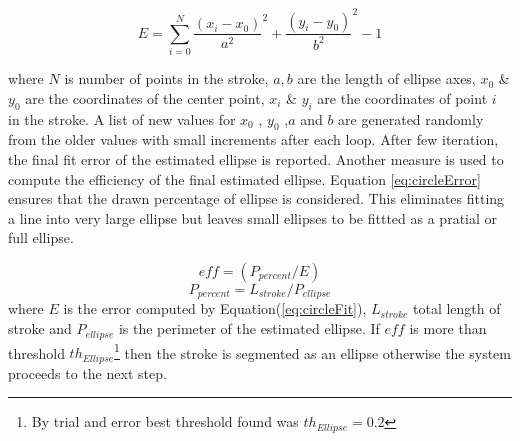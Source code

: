 \documentclass{article}
\begin{document}
\begin{equation}
E = \sum\limits_{i = 0}^N {\frac{{(x_i - x_0 )}}{{a^2 }}^2  + \frac{{(y_i - y_0 )}}{{b^2 }}^2  - 1} 
\label{eq:circleFit}
\end{equation}

 where $N$ is number of points in the stroke, $a,b$ are the length of ellipse axes, $x_0$ \& $y_0$ are the coordinates of the center point, $x_i$ \& $y_i$ are the coordinates of point $i$ in the stroke. A list of new values for $x_0$ , $y_0$ ,$a$ and $b$ are generated randomly from the older values with small increments after each loop.  After few iteration, the final fit error of the estimated ellipse is reported. Another measure is used to compute the efficiency of the final estimated ellipse. Equation \ref{eq:circleError} ensures that the drawn percentage of ellipse is considered. This eliminates fitting a  line into very large ellipse but leaves small ellipses to be fittted as a pratial or full ellipse. 

 \begin{equation}
eff= (P_{percent}/E)
\label{eq:circleError}
\end{equation}
 \begin{equation}
P_{percent}  = L_{stroke} /P_{ellipse} 
\label{eq:ErrorArea}
\end{equation}
where $E$ is the error computed by Equation(\ref{eq:circleFit}), $L_{stroke}$ total length of stroke and $P_{ellipse} $ is the perimeter of the estimated ellipse. If $eff$ is more than threshold $th_{Ellipse}$\footnote{By trial and error best threshold found was $th_{Ellipse}=0.2$} then the stroke is segmented as an ellipse otherwise the system proceeds to the next step. 
\end{document}
